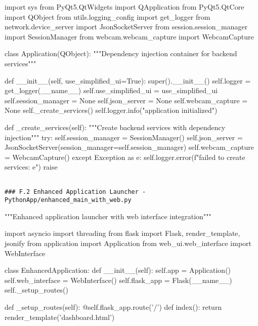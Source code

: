 \documentclass[11pt,a4paper]{report}
\begin{document}
import sys
from PyQt5.QtWidgets import QApplication
from PyQt5.QtCore import QObject
from utils.logging\_config import get\_logger
from network.device\_server import JsonSocketServer
from session.session\_manager import SessionManager
from webcam.webcam\_capture import WebcamCapture


class Application(QObject):
    """Dependency injection container for backend services"""

    def \_\_init\_\_(self, use\_simplified\_ui=True):
        super().\_\_init\_\_()
        self.logger = get\_logger(\_\_name\_\_)
        self.use\_simplified\_ui = use\_simplified\_ui
        self.session\_manager = None
        self.json\_server = None
        self.webcam\_capture = None
        self.\_create\_services()
        self.logger.info("application initialized")

    def \_create\_services(self):
        """Create backend services with dependency injection"""
        try:
            self.session\_manager = SessionManager()
            self.json\_server = JsonSocketServer(session\_manager=self.session\_manager)
            self.webcam\_capture = WebcamCapture()
        except Exception as e:
            self.logger.error(f"failed to create services: {e}")
            raise
\begin{verbatim}

### F.2 Enhanced Application Launcher - PythonApp/enhanced_main_with_web.py

\end{verbatim}
"""Enhanced application launcher with web interface integration"""

import asyncio
import threading
from flask import Flask, render\_template, jsonify
from application import Application
from web\_ui.web\_interface import WebInterface


class EnhancedApplication:
    def \_\_init\_\_(self):
        self.app = Application()
        self.web\_interface = WebInterface()
        self.flask\_app = Flask(\_\_name\_\_)
        self.\_setup\_routes()

    def \_setup\_routes(self):
        @self.flask\_app.route('/')
        def index():
            return render\_template('dashboard.html')
\end{document}
